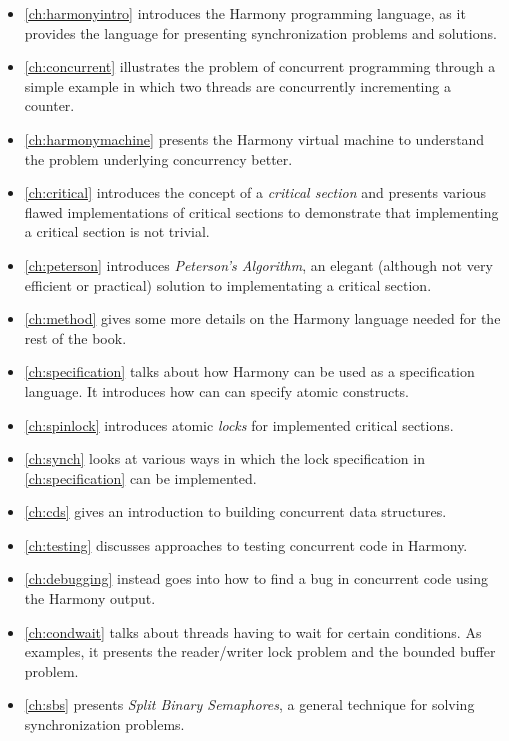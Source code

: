 \documentclass{report}
\begin{document}
\begin{itemize}
\item \autoref{ch:harmonyintro} introduces the Harmony programming
language, as it provides the language for presenting synchronization
problems and solutions.
\item \autoref{ch:concurrent} illustrates the problem of
concurrent programming through a simple example in which two threads
are concurrently incrementing a counter.
\item \autoref{ch:harmonymachine} presents the
Harmony virtual machine to understand the problem
underlying concurrency better.
\item \autoref{ch:critical} introduces the concept of a
\emph{critical section} and presents various flawed implementations
of critical sections to demonstrate that implementing a critical section
is not trivial.
\item \autoref{ch:peterson} introduces \emph{Peterson's Algorithm}, an
elegant (although not very efficient or practical) solution to implementating a critical section.
\item \autoref{ch:method} gives some more details on the Harmony
language needed for the rest of the book.
\item \autoref{ch:specification} talks about how Harmony can be used as
a specification language.  It introduces how can can specify atomic
constructs.
\item \autoref{ch:spinlock} introduces atomic \emph{locks}
for implemented critical sections.
\item \autoref{ch:synch} looks at various ways in which the lock specification
in \autoref{ch:specification} can be implemented.
\item \autoref{ch:cds} gives an introduction to building concurrent
data structures.
\item \autoref{ch:testing} discusses approaches to testing
concurrent code in Harmony.
\item \autoref{ch:debugging} instead goes into how to find a bug
in concurrent code using the Harmony output.
\item \autoref{ch:condwait} talks about threads having to wait for
certain conditions.  As examples, it presents the reader/writer lock
problem and the bounded buffer problem.
\item \autoref{ch:sbs} presents \emph{Split Binary Semaphores}, a
general technique for solving synchronization problems.

\end{itemize}
\end{document}
